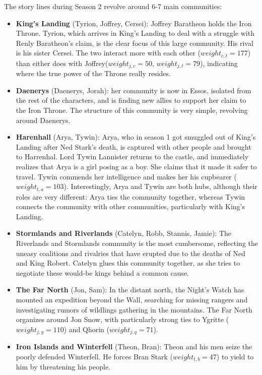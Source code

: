 \documentclass[10pt,twocolumn,letterpaper]{article}
\begin{document}
The story lines during Season 2 revolve around 6-7 main communities:

\begin{itemize}
    \item \textbf{King's Landing} (Tyrion, Joffrey, Cersei): Joffrey Baratheon holds the Iron Throne. Tyrion, which arrives in King's Landing to deal with a struggle with Renly Baratheon's claim, is the clear focus of this large community. His rival is his sister Cersei. The two interact more with each other ($weight_{c,t}=177$) than either does with Joffrey($weight_{j,c}=50$, $weight_{j,t}=79$), indicating where the true power of the Throne really resides.
    \item \textbf{Daenerys} (Daenerys, Jorah): her community is now in Essos, isolated from the rest of the characters, and is finding new allies to support her claim to the Iron Throne. The structure of this community is very simple, revolving around Daenerys.
    \item \textbf{Harenhall} (Arya, Tywin): Arya, who in season 1 got smuggled out of King's Landing after Ned Stark's death, is captured with other people and brought to Harrenhal. Lord Tywin Lannister returns to the castle, and immediately realizes that Arya is a girl posing as a boy. She claims that it made it safer to travel. Tywin commends her intelligence and makes her his cupbearer ($weight_{t,a}=103$). 
    Interestingly, Arya and Tywin are both hubs, although their roles are very different: Arya ties the community together, whereas Tywin connects the community with other communities, particularly with King's Landing.
    \item  \textbf{Stormlands and Riverlands} (Catelyn, Robb, Stannis, Jamie): The Riverlands and Stormlands community is the most cumbersome, reflecting the uneasy coalitions and rivalries that have erupted due to the deaths of Ned and King Robert. Catelyn glues this community together, as she tries to negotiate these would-be kings behind a common cause.
    \item  \textbf{The Far North} (Jon, Sam):  In the distant north, the Night's Watch has mounted an expedition beyond the Wall, searching for missing rangers and investigating rumors of wildlings gathering in the mountains. The Far North organizes around Jon Snow, with particularly strong ties to Ygritte ($weight_{j,y}=110$) and Qhorin ($weight_{j,q}=71$).
    \item  \textbf{Iron Islands and Winterfell} (Theon, Bran): Theon and his men seize the poorly defended Winterfell. He forces Bran Stark ($weight_{t,b}=47$) to yield to him by threatening his people. 
    
\end{itemize}
\end{document}
